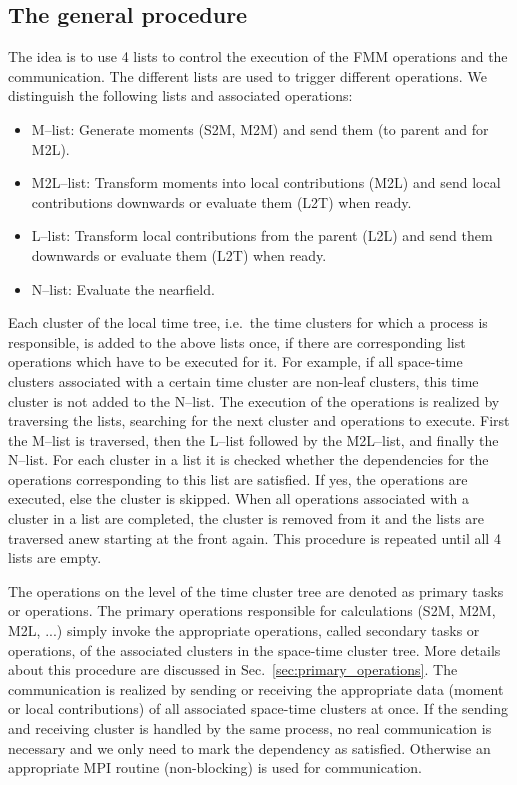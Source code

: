 \documentclass[a4paper,11pt]{article}
\theoremstyle{plain}
\theoremstyle{definition}
\theoremstyle{remark}
\begin{document}
\subsection{The general procedure} \label{sec:fmm_general_procedure}
The idea is to use 4 lists to control the execution of the FMM operations and the communication. The different lists are used to trigger different operations. We distinguish the following lists and associated operations:
\begin{itemize}
  \item M--list: Generate moments (S2M, M2M) and send them (to parent and for M2L).
  \item M2L--list: Transform moments into local contributions (M2L) and send local contributions downwards or evaluate them (L2T) when ready.
  \item L--list: Transform local contributions from the parent (L2L) and send them downwards or evaluate them (L2T) when ready.
  \item N--list: Evaluate the nearfield.
\end{itemize}
Each cluster of the local time tree, i.e.~the time clusters for which a process is responsible, is added to the above lists once, if there are corresponding list operations which have to be executed for it. For example, if all space-time clusters associated with a certain time cluster are non-leaf clusters, this time cluster is not added to the N--list.  The execution of the operations is realized by traversing the lists, searching for the next cluster and operations to execute. First the M--list is traversed, then the L--list followed by the M2L--list, and finally the N--list. For each cluster in a list it is checked whether the dependencies for the operations corresponding to this list are satisfied. If yes, the operations are executed, else the cluster is skipped. When all operations associated with a cluster in a list are completed, the cluster is removed from it and the lists are traversed anew starting at the front again. This procedure is repeated until all 4 lists are empty.

The operations on the level of the time cluster tree are denoted as primary tasks or operations. The primary operations responsible for calculations (S2M, M2M, M2L, ...) simply invoke the appropriate operations, called secondary tasks or operations, of the associated clusters in the space-time cluster tree. More details about this procedure are discussed in Sec.~\ref{sec:primary_operations}. The communication is realized by sending or receiving the appropriate data (moment or local contributions) of all associated space-time clusters at once. If the sending and receiving cluster is handled by the same process, no real communication is necessary and we only need to mark the dependency as satisfied. Otherwise an appropriate MPI routine (non-blocking) is used for communication.
\end{document}
